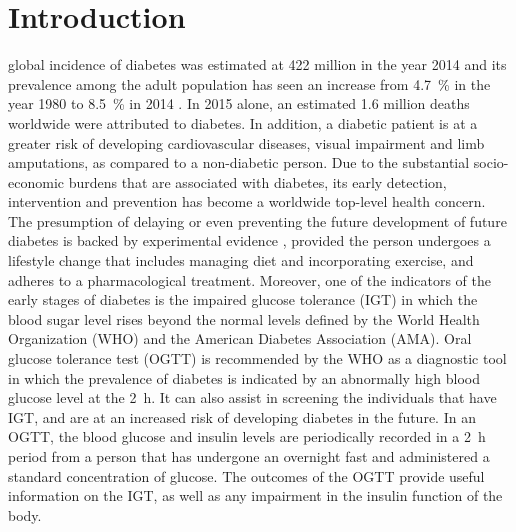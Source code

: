 \documentclass[journal,comsoc]{IEEEtran}
\renewcommand{\^}{\hat}  %
\begin{document}
\section{Introduction}
%
%
%
%
 global incidence of diabetes was estimated at \num{422} million in the year \num{2014} and its prevalence among the adult population has seen an increase from \SI{4.7}{\percent} in the year \num{1980} to \SI{8.5}{\percent} in \num{2014} \cite{mathers_projections_2006}. In \num{2015} alone, an estimated \num{1.6} million deaths worldwide were attributed to diabetes. In addition, a diabetic patient is at a greater risk of developing cardiovascular diseases, visual impairment and limb amputations, as compared to a non-diabetic person. Due to the substantial socio-economic burdens that are associated with diabetes, its early detection, intervention and prevention has become a worldwide top-level health concern.
%
%
The presumption of delaying or even preventing the future development of future diabetes is backed by experimental evidence \cite{tuomilehto2001prevention}, provided the person undergoes a lifestyle change that includes managing diet and incorporating exercise, and adheres to a pharmacological treatment. Moreover, one of the indicators of the early stages of diabetes is the impaired glucose tolerance (IGT) in which the blood sugar level rises beyond the normal levels defined by the World Health Organization (WHO) and the American Diabetes Association (AMA). Oral glucose tolerance test (OGTT) is recommended by the WHO as a diagnostic tool in which the prevalence of diabetes is indicated by an abnormally high blood glucose level at the \SI{2}{\hour}. It can also assist in screening the individuals that have IGT, and are at an increased risk of developing diabetes in the future. In an OGTT, the blood glucose and insulin levels are periodically recorded in a \SI{2}{\hour} period from a person that has undergone an overnight fast and administered a standard concentration of glucose. The outcomes of the OGTT provide useful information on the IGT, as well as any impairment in the insulin function of the body.
\end{document}
